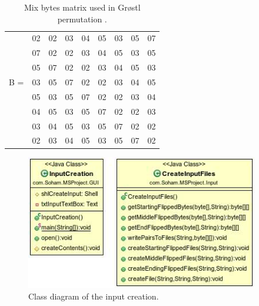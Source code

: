 \begin{table}
\begin{center}
  \begin{tabular}{ c | *{8}{c} | }
      & 02 & 02 & 03 & 04 & 05 & 03 & 05 & 07 \\
      & 07 & 02 & 02 & 03 & 04 & 05 & 03 & 05 \\
      & 05 & 07 & 02 & 02 & 03 & 04 & 05 & 03 \\
  B = & 03 & 05 & 07 & 02 & 02 & 03 & 04 & 05 \\
      & 05 & 03 & 05 & 07 & 02 & 02 & 03 & 04 \\
      & 04 & 05 & 03 & 05 & 07 & 02 & 02 & 03 \\
      & 03 & 04 & 05 & 03 & 05 & 07 & 02 & 02 \\
      & 02 & 03 & 04 & 05 & 03 & 05 & 07 & 02 \\
  \end{tabular}
  \caption{Mix bytes matrix used in Gr{\o}stl permutation \cite{00019}.}
  \label{table:GroestlMixBytesMatrix}
\end{center}
\end{table}

\begin{figure}
  \begin{center}
    \includegraphics[width=4in]{Input.jpg}
  \end{center}
  \caption{Class diagram of the input creation.}
  \label{fig:UMLInputCreation}
\end{figure}


